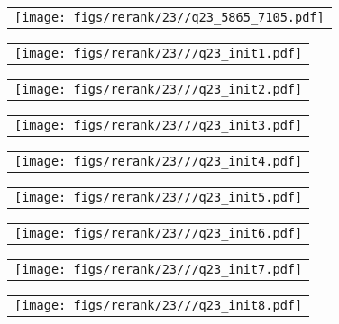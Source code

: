 \begin{figure*}[t]
\scriptsize
\newcommand{\figh}{10ex}
\centering

\begin{tabular}{@{\sssp}c@{\sssp}}\texttt{[image: figs/rerank/23//q23\_5865\_7105.pdf]}\end{tabular} 
\begin{tabular}{@{\sssp}c@{\sssp}}\texttt{[image: figs/rerank/23///q23\_init1.pdf]}\end{tabular}
\begin{tabular}{@{\sssp}c@{\sssp}}\texttt{[image: figs/rerank/23///q23\_init2.pdf]}\end{tabular}
\begin{tabular}{@{\sssp}c@{\sssp}}\texttt{[image: figs/rerank/23///q23\_init3.pdf]}\end{tabular}
\begin{tabular}{@{\sssp}c@{\sssp}}\texttt{[image: figs/rerank/23///q23\_init4.pdf]}\end{tabular}
\begin{tabular}{@{\sssp}c@{\sssp}}\texttt{[image: figs/rerank/23///q23\_init5.pdf]}\end{tabular}
\begin{tabular}{@{\sssp}c@{\sssp}}\texttt{[image: figs/rerank/23///q23\_init6.pdf]}\end{tabular}
\begin{tabular}{@{\sssp}c@{\sssp}}\texttt{[image: figs/rerank/23///q23\_init7.pdf]}\end{tabular}
\begin{tabular}{@{\sssp}c@{\sssp}}\texttt{[image: figs/rerank/23///q23\_init8.pdf]}\end{tabular}


\end{figure*}
